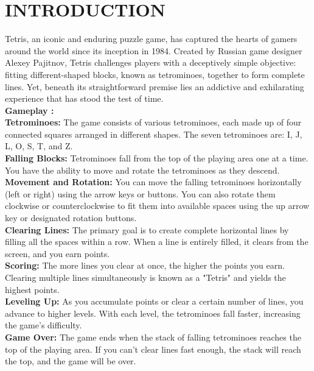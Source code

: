 \newpage
{}
\section{INTRODUCTION}
\hspace{5mm}Tetris, an iconic and enduring puzzle game, has captured the hearts of gamers around the world since its inception in 1984. Created by Russian game designer Alexey Pajitnov, Tetris challenges players with a deceptively simple objective: fitting different-shaped blocks, known as tetrominoes, together to form complete lines. Yet, beneath its straightforward premise lies an addictive and exhilarating experience that has stood the test of time.\\

\textbf{Gameplay :} \\

\textbf{Tetrominoes:} The game consists of various tetrominoes, each made up of four connected squares arranged in different shapes. The seven tetrominoes are: I, J, L, O, S, T, and Z.\\

\textbf{Falling Blocks: }Tetrominoes fall from the top of the playing area one at a time. You have the ability to move and rotate the tetrominoes as they descend.\\

\textbf{Movement and Rotation:} You can move the falling tetrominoes horizontally (left or right) using the arrow keys or buttons. You can also rotate them clockwise or counterclockwise to fit them into available spaces using the up arrow key or designated rotation buttons.\\

\textbf{Clearing Lines:} The primary goal is to create complete horizontal lines by filling all the spaces within a row. When a line is entirely filled, it clears from the screen, and you earn points.\\

\textbf{Scoring:} The more lines you clear at once, the higher the points you earn. Clearing multiple lines simultaneously is known as a "Tetris" and yields the highest points.\\

\textbf{Leveling Up:} As you accumulate points or clear a certain number of lines, you advance to higher levels. With each level, the tetrominoes fall faster, increasing the game's difficulty.\\

\textbf{Game Over:} The game ends when the stack of falling tetrominoes reaches the top of the playing area. If you can't clear lines fast enough, the stack will reach the top, and the game will be over.\\

